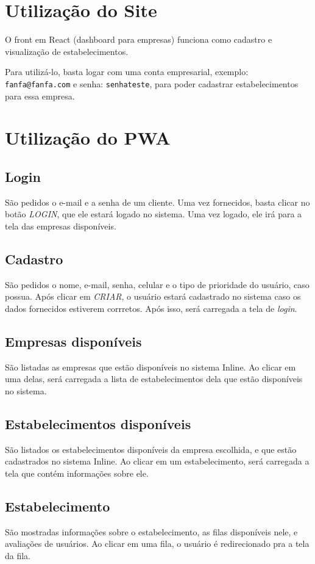 \documentclass{book}
\begin{document}
\chapter{Utilização do Site}
O front em React (dashboard para empresas) funciona como cadastro e visualização
de estabelecimentos.

Para utilizá-lo, basta logar com uma conta empresarial, exemplo:
\verb|fanfa@fanfa.com| e senha: \verb|senhateste|, para poder cadastrar
estabelecimentos para essa empresa.

\chapter{Utilização do PWA}

\section{Login}

São pedidos o e-mail e a senha de um cliente. Uma vez fornecidos, basta clicar
no botão \textit{LOGIN}, que ele estará logado no sistema. Uma vez logado, ele
irá para a tela das empresas disponíveis.

\section{Cadastro}
São pedidos o nome, e-mail, senha, celular e o tipo de prioridade do usuário,
caso possua. Após clicar em \textit{CRIAR}, o usuário estará cadastrado no
sistema caso os dados fornecidos estiverem corrretos. Após isso, será carregada
a tela de \textit{login}.

\section{Empresas disponíveis}
São listadas as empresas que estão disponíveis no sistema Inline. Ao clicar em
uma delas, será carregada a lista de estabelecimentos dela que estão disponíveis
no sistema.

\section{Estabelecimentos disponíveis}
São listados os estabelecimentos disponíveis da empresa escolhida, e que estão
cadastrados no sistema Inline. Ao clicar em um estabelecimento, será carregada a
tela que contém informações sobre ele.

\section{Estabelecimento}
São mostradas informações sobre o estabelecimento, as filas disponíveis nele, e
avaliações de usuários. Ao clicar em uma fila, o usuário é redirecionado pra a
tela da fila.
\end{document}
